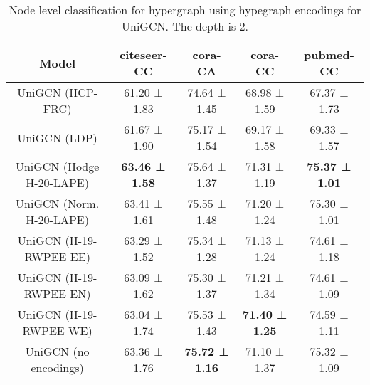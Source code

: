 \begin{table}[H]
\footnotesize
\centering
\begin{tabular}{|c|c|c|c|c|}
\hline
Model & citeseer-CC & cora-CA & cora-CC & pubmed-CC \\
\hline
UniGCN (HCP-FRC) & 61.20 ± 1.83 & 74.64 ± 1.45 & 68.98 ± 1.59 & 67.37 ± 1.73 \\
UniGCN (LDP) & 61.67 ± 1.90 & 75.17 ± 1.54 & 69.17 ± 1.58 & 69.33 ± 1.57 \\
UniGCN (Hodge H-20-LAPE) & \textbf{63.46 ± 1.58} & 75.64 ± 1.37 & 71.31 ± 1.19 & \textbf{75.37 ± 1.01} \\
UniGCN (Norm. H-20-LAPE) & 63.41 ± 1.61 & 75.55 ± 1.48 & 71.20 ± 1.24 & 75.30 ± 1.01 \\
UniGCN (H-19-RWPEE EE) & 63.29 ± 1.52 & 75.34 ± 1.28 & 71.13 ± 1.24 & 74.61 ± 1.18 \\
UniGCN (H-19-RWPEE EN) & 63.09 ± 1.62 & 75.30 ± 1.37 & 71.21 ± 1.34 & 74.61 ± 1.09 \\
UniGCN (H-19-RWPEE WE) & 63.04 ± 1.74 & 75.53 ± 1.43 & \textbf{71.40 ± 1.25} & 74.59 ± 1.11 \\
\hline
UniGCN (no encodings) & 63.36 ± 1.76 & \textbf{75.72 ± 1.16} & 71.10 ± 1.37 & 75.32 ± 1.09 \\
\hline
\end{tabular}
\caption{Node level classification for hypergraph using hypegraph encodings for UniGCN. The depth is 2.}
\label{tab:hg_node_classification_UniGCN}
\end{table}


